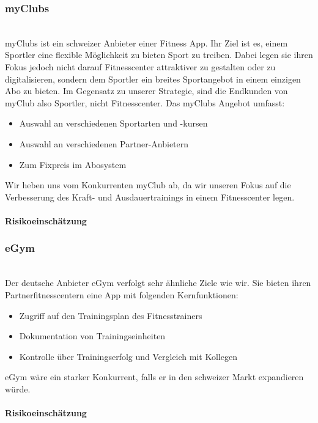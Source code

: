 \subsubsection{myClubs}\hfill \\
myClubs\cite{myclubs} ist ein schweizer Anbieter einer Fitness App. Ihr Ziel ist es, einem Sportler eine flexible Möglichkeit zu bieten Sport zu treiben. Dabei legen sie ihren Fokus jedoch nicht darauf Fitnesscenter attraktiver zu gestalten oder zu digitalisieren, sondern dem Sportler ein breites Sportangebot in einem einzigen Abo zu bieten. Im Gegensatz zu unserer Strategie, sind die Endkunden von myClub also Sportler, nicht Fitnesscenter.
Das myClubs Angebot umfasst:
\begin{itemize}
	\item Auswahl an verschiedenen Sportarten und -kursen
	\item Auswahl an verschiedenen Partner-Anbietern
	\item Zum Fixpreis im Abosystem
\end{itemize}
Wir heben uns vom Konkurrenten myClub ab, da wir unseren Fokus auf die Verbesserung des Kraft- und Ausdauertrainings in einem Fitnesscenter legen.
\paragraph{Risikoeinschätzung} \qquad {}
\subsubsection{eGym}\hfill \\
Der deutsche Anbieter eGym\cite{egym} verfolgt sehr ähnliche Ziele wie wir. Sie bieten ihren Partnerfitnesscentern eine App mit folgenden Kernfunktionen:
\begin{itemize}
	\item Zugriff auf den Trainingsplan des Fitnesstrainers
	\item Dokumentation von Trainingseinheiten
	\item Kontrolle über Trainingserfolg und Vergleich mit Kollegen
\end{itemize}
eGym wäre ein starker Konkurrent, falls er in den schweizer Markt expandieren würde.
\paragraph{Risikoeinschätzung} \qquad {}
